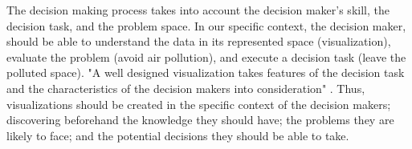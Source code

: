 The decision making process takes into account the decision maker's skill, the decision task, and the problem space. In our specific context, the decision maker, should be able to understand the data in its represented space (visualization), evaluate the problem (avoid air pollution), and execute a decision task (leave the polluted space). "A well designed visualization takes features of the decision task and the characteristics of the decision makers into consideration" \cite{Zhu2008}. Thus, visualizations should be created in the specific context of the decision makers; discovering beforehand the knowledge they should have; the problems they are likely to face; and the potential decisions they should be able to take. 
